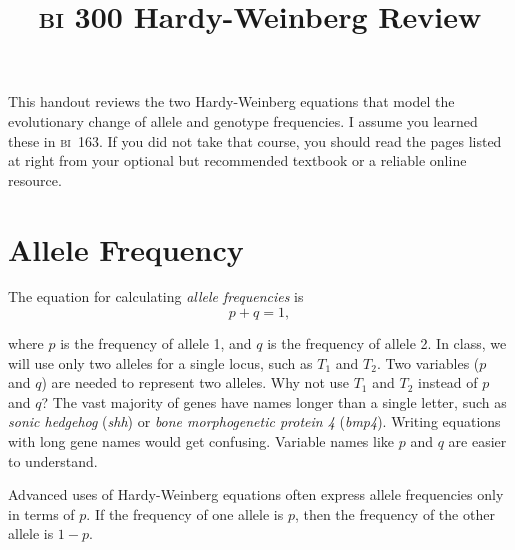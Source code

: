 \documentclass[letterpaper]{tufte-handout}
\title{{\scshape bi} 300 Hardy-Weinberg Review}
\date{} %
\begin{document}
\maketitle	%


This handout 
reviews the two Hardy-Weinberg equations that model the evolutionary
change of allele and genotype frequencies. I assume you learned these in 
{\scshape bi}~163. If you did not take that course, you should read the pages
listed at right from your optional but recommended textbook or a reliable online resource.

\section*{Allele Frequency}

The equation for calculating \emph{allele frequencies} is 
\begin{equation*}
p+q = 1,
\end{equation*}

where $p$ is the frequency of allele 1, and $q$ is the frequency of allele 2. In class, we will use only two alleles for a single locus, such as $T_1$ and $T_2$.  Two variables ($p$ and $q$) are needed to represent two alleles.  Why not use $T_1$ and $T_2$ instead of $p$ and $q$?  The vast majority of genes have names longer than a single letter, such as \emph{sonic hedgehog} (\emph{shh}) or \emph{bone morphogenetic protein 4} (\emph{bmp4}). Writing equations with long gene names would get confusing. Variable names like $p$ and $q$ are easier to understand.  

Advanced uses of Hardy-Weinberg equations often express allele frequencies only in terms of $p$. If the frequency of one allele is $p$, then the frequency of the other allele is $1-p.$
\end{document}
